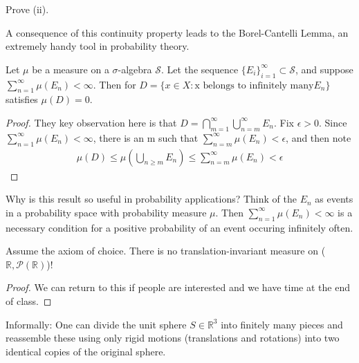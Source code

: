 \documentclass[11pt]{scrartcl}
\begin{document}
\begin{exercise}
Prove (ii).
\end{exercise}

A consequence of this continuity property leads to the Borel-Cantelli Lemma, an extremely handy tool in probability theory.

\begin{lemma}
Let $\mu$ be a measure on a $\sigma$-algebra $\mathcal{S}$. Let the sequence $\{E_i\}_{i=1}^\infty \subset \mathcal{S}$, and suppose $\sum_{n=1}^\infty \mu(E_n) <\infty$.
Then for $D = \{x\in X : \text{x belongs to infinitely many} E_n\}$ satisfies $\mu(D) = 0$. 
\end{lemma}

\begin{proof}
They key observation here is that $D = \bigcap_{m=1}^\infty \bigcup_{n=m}^\infty E_n$. Fix $\epsilon > 0$. Since $\sum_{n=1}^\infty \mu(E_n) <\infty$, there is an m such that $\sum_{n=m}^\infty \mu(E_n) <\epsilon$, and then note 
\begin{align*}
\mu(D) \leq \mu(\bigcup_{n\geq m} E_n) \leq \sum_{n=m}^\infty \mu(E_n) <\epsilon 
\end{align*}
\end{proof}

\begin{example}
Why is this result so useful in probability applications? Think of the $E_n$ as events in a probability space with probability measure $\mu$. Then  $\sum_{n=1}^\infty \mu(E_n) <\infty$ is a necessary condition for a positive probability of an event occuring infinitely often.
\end{example}


\begin{theorem}
Assume the axiom of choice. There is no translation-invariant measure on ($\mathbb{R},\mathcal{P}(\mathbb{R})$)!
\end{theorem}
\begin{proof} 
We can return to this if people are interested and we have time at the end of class.
\end{proof}

\begin{theorem}
Informally: One can divide the unit sphere  $S \in \mathbb{R}^3$ into finitely many pieces and reassemble these using only rigid motions (translations and rotations) into two identical copies of the original sphere. 
\end{theorem}
\end{document}
